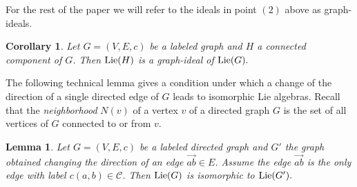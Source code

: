 \documentclass[12pt]{amsart}
\newtheorem{cor}[teo]{Corollary}
\newtheorem{lemma}[teo]{Lemma}
\begin{document}
For the rest of the paper we will refer to the ideals in point $(2)$ above as graph-ideals.

\begin{cor}
Let $G=(V,E,c)$ be a labeled graph and $H$ a connected component of $G$. Then ${\rm Lie}(H)$ is a graph-ideal of ${\rm Lie}(G).$
\end{cor}

The following technical lemma gives a condition under which a change of the direction of a single directed edge of $G$ leads to isomorphic Lie algebras. Recall that the {\it neighborhood} $N(v)$ of a vertex $v$ of a directed graph $G$ is the set of all vertices of $G$ connected to or from $v$. 

\begin{lemma}\label{direction}
Let $G=(V,E,c)$ be a labeled directed graph and $G'$ the graph obtained changing the direction of an edge $\overrightarrow{ab}\in E$. Assume the edge $\overrightarrow{ab}$ is the only edge with label $c(a,b)\in{\mathcal C}$. Then ${\rm Lie}(G)$ is isomorphic to ${\rm Lie}(G').$
\end{lemma}
\end{document}

